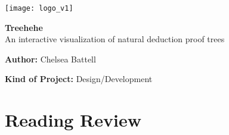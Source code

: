\documentclass[12pt]{article}
\newcommand{\projectname}{Treehehe}
\begin{document}




\begin{center}
\texttt{[image: logo\_v1]} \\

\vspace{15px}

{\LARGE \textbf{\projectname{}}} \\
\vspace{10px}
An interactive visualization of natural deduction proof trees \\
\end{center}

\vspace*{20pt}


\noindent \textbf{Author:} Chelsea Battell



\noindent \textbf{Kind of Project:} Design/Development

\vspace*{20pt}

\section{Reading Review}

\end{document}
